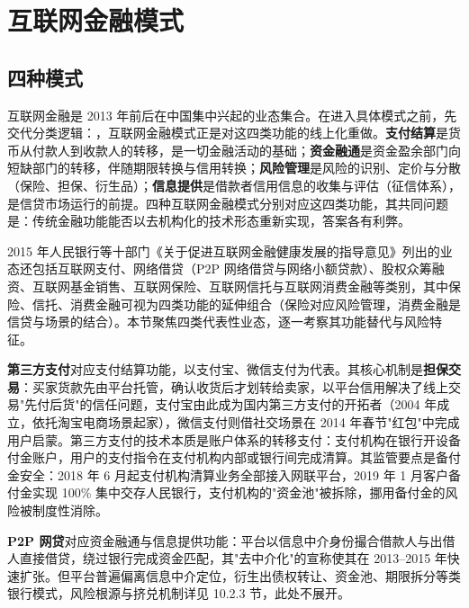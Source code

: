 \section{互联网金融模式}

\subsection{四种模式}

互联网金融是 2013 年前后在中国集中兴起的业态集合。在进入具体模式之前，先交代分类逻辑：，互联网金融模式正是对这四类功能的线上化重做。\textbf{支付结算}是货币从付款人到收款人的转移，是一切金融活动的基础；\textbf{资金融通}是资金盈余部门向短缺部门的转移，伴随期限转换与信用转换；\textbf{风险管理}是风险的识别、定价与分散（保险、担保、衍生品）；\textbf{信息提供}是借款者信用信息的收集与评估（征信体系），是信贷市场运行的前提。四种互联网金融模式分别对应这四类功能，其共同问题是：传统金融功能能否以去机构化的技术形态重新实现，答案各有利弊。

2015 年人民银行等十部门《关于促进互联网金融健康发展的指导意见》列出的业态还包括互联网支付、网络借贷（P2P 网络借贷与网络小额贷款）、股权众筹融资、互联网基金销售、互联网保险、互联网信托与互联网消费金融等类别，其中保险、信托、消费金融可视为四类功能的延伸组合（保险对应风险管理，消费金融是信贷与场景的结合）。本节聚焦四类代表性业态，逐一考察其功能替代与风险特征。

\textbf{第三方支付}对应支付结算功能，以支付宝、微信支付为代表。其核心机制是\textbf{担保交易}：买家货款先由平台托管，确认收货后才划转给卖家，以平台信用解决了线上交易"先付后货"的信任问题，支付宝由此成为国内第三方支付的开拓者（2004 年成立，依托淘宝电商场景起家），微信支付则借社交场景在 2014 年春节"红包"中完成用户启蒙。第三方支付的技术本质是账户体系的转移支付：支付机构在银行开设备付金账户，用户的支付指令在支付机构内部或银行间完成清算。其监管要点是备付金安全：2018 年 6 月起支付机构清算业务全部接入网联平台，2019 年 1 月客户备付金实现 100\% 集中交存人民银行，支付机构的"资金池"被拆除，挪用备付金的风险被制度性消除。

\textbf{P2P 网贷}对应资金融通与信息提供功能：平台以信息中介身份撮合借款人与出借人直接借贷，绕过银行完成资金匹配，其"去中介化"的宣称使其在 2013--2015 年快速扩张。但平台普遍偏离信息中介定位，衍生出债权转让、资金池、期限拆分等类银行模式，风险根源与挤兑机制详见 10.2.3 节，此处不展开。

